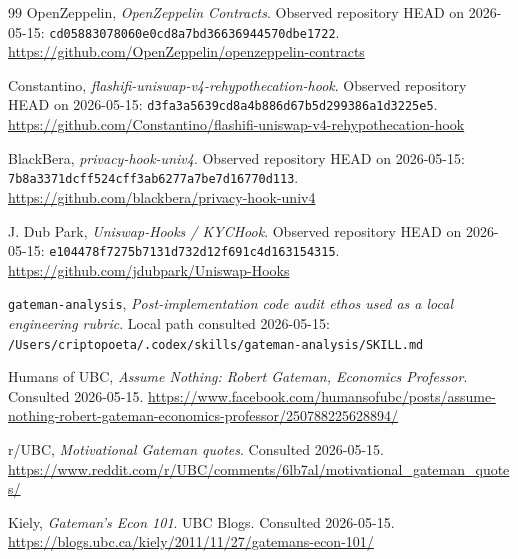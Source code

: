 \documentclass[11pt]{article}
\begin{document}
\begin{thebibliography}{99}
OpenZeppelin, \textit{OpenZeppelin Contracts}. Observed repository HEAD on
2026-05-15: \texttt{cd05883078060e0cd8a7bd36636944570dbe1722}.
\url{https://github.com/OpenZeppelin/openzeppelin-contracts}

Constantino, \textit{flashifi-uniswap-v4-rehypothecation-hook}. Observed
repository HEAD on 2026-05-15:
\texttt{d3fa3a5639cd8a4b886d67b5d299386a1d3225e5}.
\url{https://github.com/Constantino/flashifi-uniswap-v4-rehypothecation-hook}

BlackBera, \textit{privacy-hook-univ4}. Observed repository HEAD on
2026-05-15: \texttt{7b8a3371dcff524cff3ab6277a7be7d16770d113}.
\url{https://github.com/blackbera/privacy-hook-univ4}

J. Dub Park, \textit{Uniswap-Hooks / KYCHook}. Observed repository HEAD on
2026-05-15: \texttt{e104478f7275b7131d732d12f691c4d163154315}.
\url{https://github.com/jdubpark/Uniswap-Hooks}

\texttt{gateman-analysis}, \textit{Post-implementation code audit ethos used
as a local engineering rubric}. Local path consulted 2026-05-15:
\texttt{/Users/criptopoeta/.codex/skills/gateman-analysis/SKILL.md}

Humans of UBC, \textit{Assume Nothing: Robert Gateman, Economics Professor}.
Consulted 2026-05-15.
\url{https://www.facebook.com/humansofubc/posts/assume-nothing-robert-gateman-economics-professor/250788225628894/}

r/UBC, \textit{Motivational Gateman quotes}. Consulted 2026-05-15.
\url{https://www.reddit.com/r/UBC/comments/6lb7al/motivational_gateman_quotes/}

Kiely, \textit{Gateman's Econ 101}. UBC Blogs. Consulted 2026-05-15.
\url{https://blogs.ubc.ca/kiely/2011/11/27/gatemans-econ-101/}

\end{thebibliography}
\end{document}
